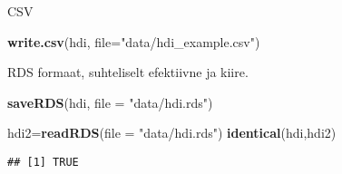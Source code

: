 \documentclass[]{article}
\newenvironment{Shaded}{\begin{snugshade}}{\end{snugshade}}
\newcommand{\KeywordTok}[1]{\textcolor[rgb]{0.13,0.29,0.53}{\textbf{#1}}}
\newcommand{\DataTypeTok}[1]{\textcolor[rgb]{0.13,0.29,0.53}{#1}}
\newcommand{\StringTok}[1]{\textcolor[rgb]{0.31,0.60,0.02}{#1}}
\newcommand{\NormalTok}[1]{#1}
\begin{document}
CSV

\begin{Shaded}
\begin{Highlighting}[]
\KeywordTok{write.csv}\NormalTok{(hdi, }\DataTypeTok{file=}\StringTok{"data/hdi_example.csv"}\NormalTok{)}
\end{Highlighting}
\end{Shaded}

RDS formaat, suhteliselt efektiivne ja kiire.

\begin{Shaded}
\begin{Highlighting}[]
\KeywordTok{saveRDS}\NormalTok{(hdi, }\DataTypeTok{file =} \StringTok{"data/hdi.rds"}\NormalTok{)}
\end{Highlighting}
\end{Shaded}

\begin{Shaded}
\begin{Highlighting}[]
\NormalTok{hdi2=}\KeywordTok{readRDS}\NormalTok{(}\DataTypeTok{file =} \StringTok{"data/hdi.rds"}\NormalTok{)}
\KeywordTok{identical}\NormalTok{(hdi,hdi2)}
\end{Highlighting}
\end{Shaded}

\begin{verbatim}
## [1] TRUE
\end{verbatim}
\end{document}
